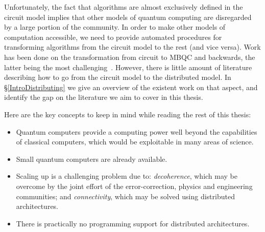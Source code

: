 Unfortunately, the fact that algorithms are almost exclusively defined in the circuit model implies that other models of quantum computing are disregarded by a large portion of the community. In order to make other models of computation accessible, we need to provide automated procedures for transforming algorithms from the circuit model to the rest (and vice versa). Work has been done on the transformation from circuit to MBQC and backwards, the latter being the most challenging~\citep{gflow}. However, there is little amount of literature describing how to go from the circuit model to the distributed model. In \S\ref{IntroDistributing} we give an overview of the existent work on that aspect, and identify the gap on the literature we aim to cover in this thesis.

\begin{remark} \normalfont 
Here are the key concepts to keep in mind while reading the rest of this thesis:
\begin{itemize}
\item Quantum computers provide a computing power well beyond the capabilities of classical computers, which would be exploitable in many areas of science.
\item Small quantum computers are already available. 
\item Scaling up is a challenging problem due to: \textit{decoherence}, which may be overcome by the joint effort of the error-correction, physics and engineering communities; and \textit{connectivity}, which may be solved using distributed architectures.
\item There is practically no programming support for distributed architectures.
\end{itemize}
\end{remark}
